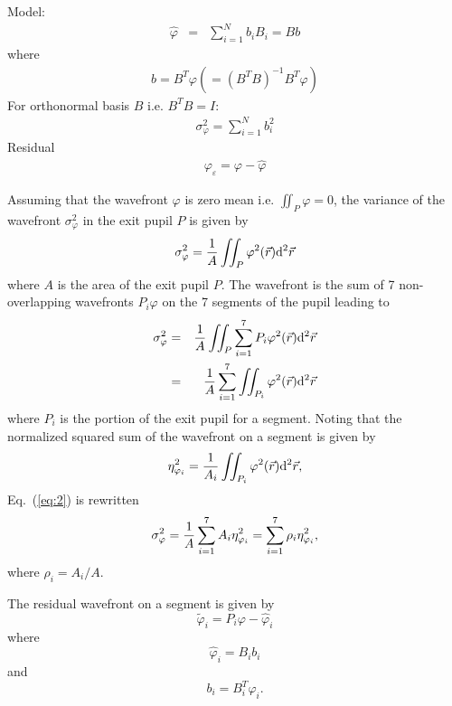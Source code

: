 \documentclass{gmto}
\begin{document}
Model:
\begin{eqnarray}
  \hat\varphi &=& \sum_{i=1}^N b_i B_i = Bb
\end{eqnarray}
where
\begin{eqnarray}
  b  = B^T\varphi ( =(B^TB)^{-1}B^T \varphi)
\end{eqnarray}
For orthonormal basis $B$ i.e. $B^TB=I$:
\begin{eqnarray}
  \sigma^2_\varphi = \sum_{i=1}^N b^2_i
\end{eqnarray}
Residual
\begin{eqnarray}
  \varphi_\varepsilon = \varphi - \hat\varphi
\end{eqnarray}

Assuming that the wavefront $\varphi$ is zero mean i.e. $\iint_P \varphi=0$, the
variance of the wavefront $\sigma_\varphi^2$ in the exit pupil $P$ is given by
\begin{equation}
  \label{eq:1}
  \sigma_\varphi^2 = {1 \over A} \iint_P \varphi^2(\vec r) {\rm d}^2\vec r
\end{equation}
where $A$ is the area of the exit pupil $P$.
The wavefront is the sum of 7 non-overlapping wavefronts $P_i\varphi$ on the 7
segments of the pupil leading to
\begin{eqnarray}
  \label{eq:2}
  \sigma_\varphi^2 &=& {1 \over A} \iint_P \sum_{i=1}^7 P_i\varphi^2(\vec r) {\rm
                       d}^2\vec r   \\
                   &=& {1 \over A} \sum_{i=1}^7 \iint_{P_i} \varphi^2(\vec r) {\rm
                       d}^2\vec r   
\end{eqnarray}
where $P_i$ is the portion of the exit pupil for a segment.
Noting that the normalized squared sum of the wavefront on a segment is given by
\begin{equation}
  \label{eq:3}
  \eta_{\varphi_i}^2 = {1 \over A_i} \iint_{P_i} \varphi^2(\vec r) {\rm d}^2\vec r,
\end{equation}
Eq.~(\ref{eq:2}) is rewritten
\begin{equation}
  \label{eq:4}
  \sigma_\varphi^2 = {1 \over A} \sum_{i=1}^7 A_i  \eta_{\varphi_i}^2 = \sum_{i=1}^7 \rho_i  \eta_{\varphi_i}^2,    
\end{equation}
where $\rho_i=A_i/A$.

The residual wavefront on a segment is given by
\begin{equation}
  \label{eq:5}
  \tilde\varphi_i = P_i\varphi - \hat\varphi_i  
\end{equation}
where
\begin{equation}
  \label{eq:6}
  \hat\varphi_i = B_ib_i
\end{equation}
and
\begin{equation}
  \label{eq:7}
  b_i = B_i^T\varphi_i.
\end{equation}
\end{document}
